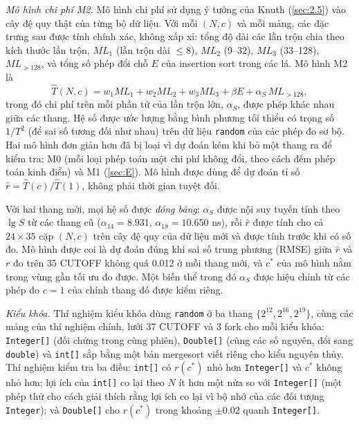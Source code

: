 \documentclass[12pt,a4paper]{article}
\begin{document}
\emph{Mô hình chi phí M2.} Mô hình chi phí sử dụng ý tưởng của Knuth (\cref{sec:2.5}) vào cây đệ quy thật của từng bộ dữ liệu. Với mỗi $(N, c)$ và mỗi mảng, các đặc trưng sau được tính chính xác, không xấp xỉ: tổng độ dài các lần trộn chia theo kích thước lần trộn, $ML_1$ (lần trộn dài $\le 8$), $ML_2$ (9--32), $ML_3$ (33--128), $ML_{>128}$, và tổng số phép đổi chỗ $E$ của insertion sort trong các lá. Mô hình M2 là
\begin{equation}
\hat T(N,c) = w_1 ML_1 + w_2 ML_2 + w_3 ML_3 + \beta E + \alpha_S\, ML_{>128},
\label{eq:m2}
\end{equation}
trong đó chi phí trên mỗi phần tử của lần trộn lớn, $\alpha_S$, được phép khác nhau giữa các thang. Hệ số được ước lượng bằng bình phương tối thiểu có trọng số $1/T^2$ (để sai số tương đối như nhau) trên dữ liệu \texttt{random} của các phép đo sơ bộ. Hai mô hình đơn giản hơn đã bị loại vì dự đoán kém khi bỏ một thang ra để kiểm tra: M0 (mỗi loại phép toán một chi phí không đổi, theo cách đếm phép toán kinh điển) và M1 (\cref{sec:E}). Mô hình được dùng để dự đoán tỉ số $\hat r = \hat T(c)/\hat T(1)$, không phải thời gian tuyệt đối.

Với hai thang mới, mọi hệ số được \emph{đóng băng}; $\alpha_S$ được nội suy tuyến tính theo $\lg S$ từ các thang cũ ($\alpha_{14} = 8.931$, $\alpha_{18} = 10.650$ ns), rồi $\hat r$ được tính cho cả $24 \times 35$ cặp $(N, c)$ trên cây đệ quy của dữ liệu mới và được tính trước khi có số đo. Mô hình được coi là dự đoán đúng khi sai số trung phương (RMSE) giữa $\hat r$ và $r$ đo trên 35 CUTOFF không quá 0.012 ở mỗi thang mới, và $c^*$ của mô hình nằm trong vùng gần tối ưu đo được. Một biến thể trong đó $\alpha_S$ được hiệu chỉnh từ các phép đo $c = 1$ của chính thang đó được kiểm riêng.

\emph{Kiểu khóa.} Thí nghiệm kiểu khóa dùng \texttt{random} ở ba thang $\{2^{12}, 2^{16}, 2^{19}\}$, cùng các mảng của thí nghiệm chính, lưới 37 CUTOFF và 3 fork cho mỗi kiểu khóa: \texttt{Integer[]} (đối chứng trong cùng phiên), \texttt{Double[]} (cùng các số nguyên, đổi sang \texttt{double}) và \texttt{int[]} sắp bằng một bản mergesort viết riêng cho kiểu nguyên thủy. Thí nghiệm kiểm tra ba điều: \texttt{int[]} có $r(c^*)$ nhỏ hơn \texttt{Integer[]} và $c^*$ không nhỏ hơn; lợi ích của \texttt{int[]} co lại theo $N$ ít hơn một nửa so với \texttt{Integer[]} (một phép thử cho cách giải thích rằng lợi ích co lại vì bộ nhớ của các đối tượng \texttt{Integer}); và \texttt{Double[]} cho $r(c^*)$ trong khoảng $\pm 0.02$ quanh \texttt{Integer[]}.
\end{document}
